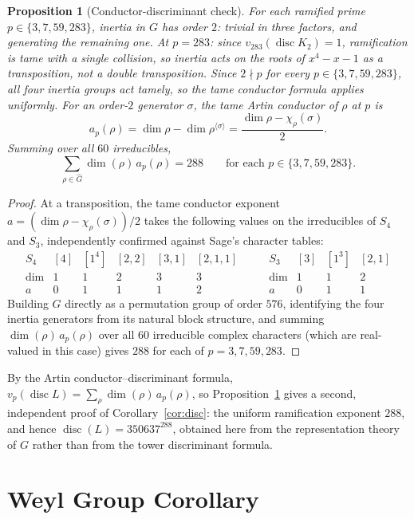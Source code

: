 \documentclass[12pt]{amsart}
\newtheorem{proposition}[theorem]{Proposition}
\DeclareMathOperator{\disc}{disc}
\begin{document}
\begin{proposition}[Conductor-discriminant check]\label{prop:artin-conductor}
For each ramified prime $p\in\{3,7,59,283\}$, inertia in $G$ has order
$2$: trivial in three factors, and generating the remaining one. At
$p=283$: since $v_{283}(\disc K_2)=1$, ramification is tame with a
single collision, so inertia acts on the roots of $x^4-x-1$ as a
transposition, not a double transposition. Since $2\nmid p$ for every
$p\in\{3,7,59,283\}$, all four inertia groups act tamely, so the tame
conductor formula applies uniformly. For an order-$2$ generator
$\sigma$, the tame Artin conductor of $\rho$ at $p$ is
\[
a_p(\rho)=\dim\rho-\dim\rho^{\langle\sigma\rangle}
=\frac{\dim\rho-\chi_\rho(\sigma)}{2}.
\]
Summing over all $60$ irreducibles,
\[
\sum_{\rho\in\widehat G}\dim(\rho)\,a_p(\rho)=288
\qquad\text{for each }p\in\{3,7,59,283\}.
\]
\end{proposition}
\begin{proof}
At a transposition, the tame conductor exponent
$a=(\dim\rho-\chi_\rho(\sigma))/2$ takes the following values on the
irreducibles of $S_4$ and $S_3$, independently confirmed against Sage's
character tables:
\[
\begin{array}{c|ccccc}
S_4 & [4] & [1^4] & [2,2] & [3,1] & [2,1,1]\\\hline
\dim & 1 & 1 & 2 & 3 & 3\\
a & 0 & 1 & 1 & 1 & 2
\end{array}
\qquad
\begin{array}{c|ccc}
S_3 & [3] & [1^3] & [2,1]\\\hline
\dim & 1 & 1 & 2\\
a & 0 & 1 & 1
\end{array}
\]
Building $G$ directly as a
permutation group of order $576$, identifying the four inertia
generators from its natural block structure, and summing
$\dim(\rho)\,a_p(\rho)$ over all $60$ irreducible complex characters
(which are real-valued in this case) gives $288$ for each of
$p=3,7,59,283$.
\end{proof}

By the Artin conductor--discriminant formula,
$v_p(\disc L)=\sum_\rho\dim(\rho)\,a_p(\rho)$, so
Proposition~\ref{prop:artin-conductor} gives a second, independent proof
of Corollary~\ref{cor:disc}: the uniform ramification exponent $288$,
and hence $\disc(L)=350637^{288}$, obtained here from the representation
theory of $G$ rather than from the tower discriminant formula.

\section{Weyl Group Corollary}\label{sec:weyl}
\end{document}
